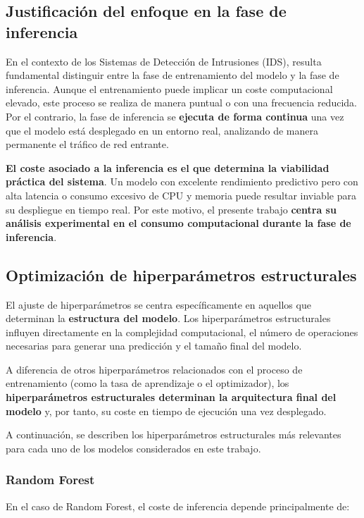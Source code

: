 \subsection{Justificación del enfoque en la fase de inferencia}

En el contexto de los Sistemas de Detección de Intrusiones (IDS), resulta fundamental distinguir entre la fase de entrenamiento del modelo y la fase de inferencia. Aunque el entrenamiento puede implicar un coste computacional elevado, este proceso se realiza de manera puntual o con una frecuencia reducida. Por el contrario, la fase de inferencia se \textbf{ejecuta de forma continua} una vez que el modelo está desplegado en un entorno real, analizando de manera permanente el tráfico de red entrante.

\textbf{El coste asociado a la inferencia es el que determina la viabilidad práctica del sistema}. Un modelo con excelente rendimiento predictivo pero con alta latencia o consumo excesivo de CPU y memoria puede resultar inviable para su despliegue en tiempo real. Por este motivo, el presente trabajo \textbf{centra su análisis experimental en el consumo computacional durante la fase de inferencia}.

\subsection{Optimización de hiperparámetros estructurales}

El ajuste de hiperparámetros se centra específicamente en aquellos que determinan la \textbf{estructura del modelo}. Los hiperparámetros estructurales influyen directamente en la complejidad computacional, el número de operaciones necesarias para generar una predicción y el tamaño final del modelo.

A diferencia de otros hiperparámetros relacionados con el proceso de entrenamiento (como la tasa de aprendizaje o el optimizador), los \textbf{hiperparámetros estructurales determinan la arquitectura final del modelo} y, por tanto, su coste en tiempo de ejecución una vez desplegado.

A continuación, se describen los hiperparámetros estructurales más relevantes para cada uno de los modelos considerados en este trabajo.

\subsubsection{Random Forest}

En el caso de Random Forest, el coste de inferencia depende principalmente de:

